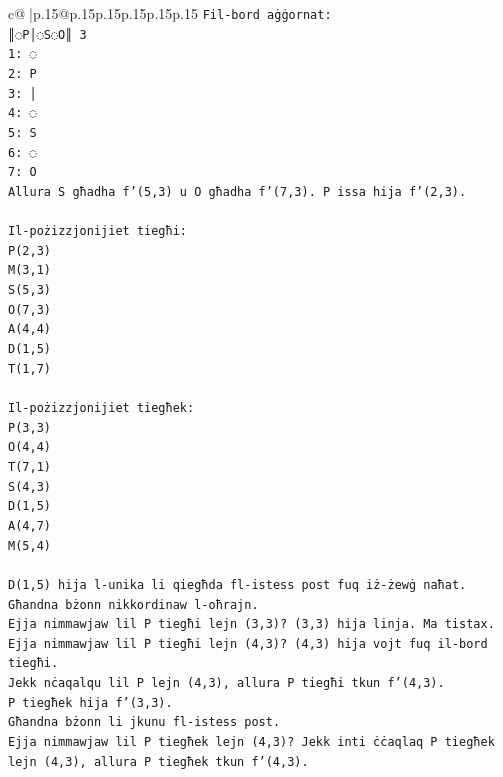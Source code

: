 \documentclass{article}
\begin{document}
{\begin{supertabular}{c@{$\;$}|p{.15\linewidth}@{}p{.15\linewidth}p{.15\linewidth}p{.15\linewidth}p{.15\linewidth}p{.15\linewidth}}
{{{\texttt{Fil{-}bord aġġornat:} \\
\texttt{║◌P│◌S◌O║ 3} \\
\texttt{1: ◌} \\
\texttt{2: P} \\
\texttt{3: │} \\
\texttt{4: ◌} \\
\texttt{5: S} \\
\texttt{6: ◌} \\
\texttt{7: O} \\
\texttt{Allura S għadha f'(5,3) u O għadha f'(7,3). P issa hija f'(2,3).} \\
\\ 
\texttt{Il{-}pożizzjonijiet tiegħi:} \\
\texttt{P(2,3)} \\
\texttt{M(3,1)} \\
\texttt{S(5,3)} \\
\texttt{O(7,3)} \\
\texttt{A(4,4)} \\
\texttt{D(1,5)} \\
\texttt{T(1,7)} \\
\\ 
\texttt{Il{-}pożizzjonijiet tiegħek:} \\
\texttt{P(3,3)} \\
\texttt{O(4,4)} \\
\texttt{T(7,1)} \\
\texttt{S(4,3)} \\
\texttt{D(1,5)} \\
\texttt{A(4,7)} \\
\texttt{M(5,4)} \\
\\ 
\texttt{D(1,5) hija l{-}unika li qiegħda fl{-}istess post fuq iż{-}żewġ naħat.} \\
\texttt{Għandna bżonn nikkordinaw l{-}oħrajn.} \\
\texttt{Ejja nimmawjaw lil P tiegħi lejn (3,3)? (3,3) hija linja. Ma tistax.} \\
\texttt{Ejja nimmawjaw lil P tiegħi lejn (4,3)? (4,3) hija vojt fuq il{-}bord tiegħi.} \\
\texttt{Jekk nċaqalqu lil P lejn (4,3), allura P tiegħi tkun f'(4,3).} \\
\texttt{P tiegħek hija f'(3,3).} \\
\texttt{Għandna bżonn li jkunu fl{-}istess post.} \\
\texttt{Ejja nimmawjaw lil P tiegħek lejn (4,3)? Jekk inti ċċaqlaq P tiegħek lejn (4,3), allura P tiegħek tkun f'(4,3).} \\
}}}
\end{supertabular}}
\end{document}
